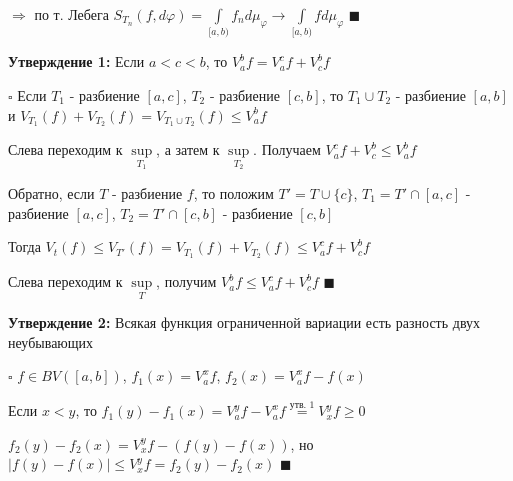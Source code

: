 \documentclass[a4paper]{report}
\begin{document}
$\Rightarrow$ по т. Лебега $S_{T_n}(f,d\varphi)=\displaystyle\int\limits_{[a,b)}f_n d\mu_\varphi\to\displaystyle\int\limits_{[a,b)}f d\mu_\varphi$ $\blacksquare$
\bigskip

\noindent\textbf{Утверждение 1:} Если $a<c<b$, то $V_a^b f=V_a^c f+V_c^b f$

\noindent $\square$ Если $T_1$ - разбиение $[a,c]$, $T_2$ - разбиение $[c,b]$, то $T_1\cup T_2$ - разбиение $[a,b]$ и $V_{T_1}(f)+V_{T_2}(f)=V_{T_1\cup T_2}(f)\le V_a^b f$

Слева переходим к $\sup\limits_{T_1}$, а затем к $\sup\limits_{T_2}$. Получаем $V_a^c f+V_c^b\le V_a^b f$

Обратно, если $T$ - разбиение $f$, то положим $T'=T\cup\{c\}$, $T_1=T'\cap[a,c]$ - разбиение $[a,c]$, $T_2=T'\cap[c,b]$ - разбиение $[c,b]$

Тогда $V_t(f)\le V_{T'}(f)=V_{T_1}(f)+V_{T_2}(f)\le V_a^c f+V_c^b f$

Слева переходим к $\sup\limits_T$, получим $V_a^b f\le V_a^c f+V_c^b f$ $\blacksquare$
\bigskip

\noindent\textbf{Утверждение 2:} Всякая функция ограниченной вариации есть разность двух неубывающих

\noindent $\square$ $f\in BV([a,b])$, $f_1(x)=V_a^x f$, $f_2(x)=V_a^x f-f(x)$

Если $x<y$, то $f_1(y)-f_1(x)=V_a^y f-V_a^x f\stackrel{\text{утв. 1}}{=}V_x^y f\ge0$

\noindent$f_2(y)-f_2(x)=V_x^y f-(f(y)-f(x))$, но $|f(y)-f(x)|\le V_x^y f=f_2(y)-f_2(x)$ $\blacksquare$
\end{document}
